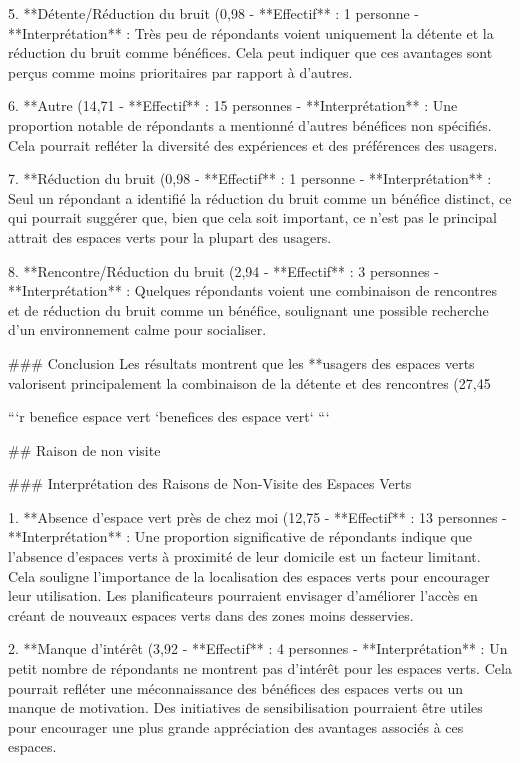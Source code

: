 5. **Détente/Réduction du bruit (0,98%
   - **Effectif** : 1 personne
   - **Interprétation** : Très peu de répondants voient uniquement la détente et la réduction du bruit comme bénéfices. Cela peut indiquer que ces avantages sont perçus comme moins prioritaires par rapport à d'autres.

6. **Autre (14,71%
   - **Effectif** : 15 personnes
   - **Interprétation** : Une proportion notable de répondants a mentionné d'autres bénéfices non spécifiés. Cela pourrait refléter la diversité des expériences et des préférences des usagers.

7. **Réduction du bruit (0,98%
   - **Effectif** : 1 personne
   - **Interprétation** : Seul un répondant a identifié la réduction du bruit comme un bénéfice distinct, ce qui pourrait suggérer que, bien que cela soit important, ce n'est pas le principal attrait des espaces verts pour la plupart des usagers.

8. **Rencontre/Réduction du bruit (2,94%
   - **Effectif** : 3 personnes
   - **Interprétation** : Quelques répondants voient une combinaison de rencontres et de réduction du bruit comme un bénéfice, soulignant une possible recherche d'un environnement calme pour socialiser.

### Conclusion
Les résultats montrent que les **usagers des espaces verts valorisent principalement la combinaison de la détente et des rencontres (27,45%

```{r benefice espace vert}
`benefices des espace vert`
```

## Raison de non visite

### Interprétation des Raisons de Non-Visite des Espaces Verts

1. **Absence d'espace vert près de chez moi (12,75%
   - **Effectif** : 13 personnes
   - **Interprétation** : Une proportion significative de répondants indique que l'absence d'espaces verts à proximité de leur domicile est un facteur limitant. Cela souligne l'importance de la localisation des espaces verts pour encourager leur utilisation. Les planificateurs pourraient envisager d'améliorer l'accès en créant de nouveaux espaces verts dans des zones moins desservies.

2. **Manque d'intérêt (3,92%
   - **Effectif** : 4 personnes
   - **Interprétation** : Un petit nombre de répondants ne montrent pas d'intérêt pour les espaces verts. Cela pourrait refléter une méconnaissance des bénéfices des espaces verts ou un manque de motivation. Des initiatives de sensibilisation pourraient être utiles pour encourager une plus grande appréciation des avantages associés à ces espaces.

